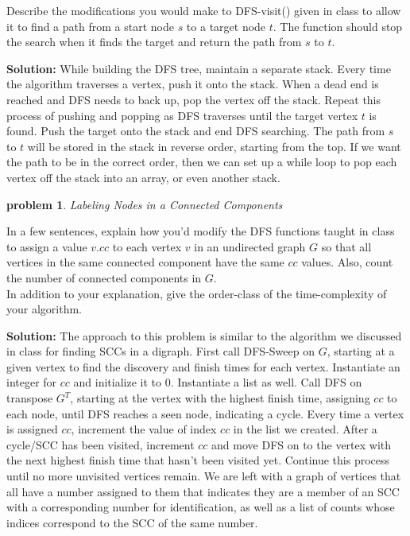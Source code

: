 \documentclass[10pt]{article}
\newcommand{\solution}[1]{\color{blue}\hfill\break\noindent\textbf{Solution:} #1\color{black}}
\newtheorem{problem}{\sc\color{cit}problem}
\begin{document}
Describe the modifications you would make to DFS-visit() given in class to allow it to find a path from a start node $s$ to a target node $t$. The function should stop the search when it finds the target and return the path from $s$ to $t$.

\solution{
    While building the DFS tree, maintain a separate stack. Every time the algorithm traverses a vertex, push it onto the stack. When a dead end is reached and DFS needs to back up, pop the vertex off the stack. Repeat this process of pushing and popping as DFS traverses until the target vertex $t$ is found. Push the target onto the stack and end DFS searching. The path from $s$ to $t$ will be stored in the stack in reverse order, starting from the top. If we want the path to be in the correct order, then we can set up a while loop to pop each vertex off the stack into an array, or even another stack.
}

\begin{problem} Labeling Nodes in a Connected Components \end{problem}

In a few sentences, explain how you'd modify the DFS functions taught in class to assign a value $v.cc$ to each vertex $v$ in an undirected graph $G$ so that all vertices in the same connected component have the same $cc$ values.  Also, count the number of connected components in $G$. \\
In addition to your explanation, give the order-class of the time-complexity of your algorithm.

\solution{
    The approach to this problem is similar to the algorithm we discussed in class for finding SCCs in a digraph. First call DFS-Sweep on $G$, starting at a given vertex to find the discovery and finish times for each vertex. Instantiate an integer for $cc$ and initialize it to 0. Instantiate a list as well. Call DFS on transpose $G^T$, starting at the vertex with the highest finish time, assigning $cc$ to each node, until DFS reaches a seen node, indicating a cycle. Every time a vertex is assigned $cc$, increment the value of index $cc$ in the list we created. After a cycle/SCC has been visited, increment $cc$ and move DFS on to the vertex with the next highest finish time that hasn't been visited yet. Continue this process until no more unvisited vertices remain. We are left with a graph of vertices that all have a number assigned to them that indicates they are a member of an SCC with a corresponding number for identification, as well as a list of counts whose indices correspond to the SCC of the same number.
}
\end{document}
